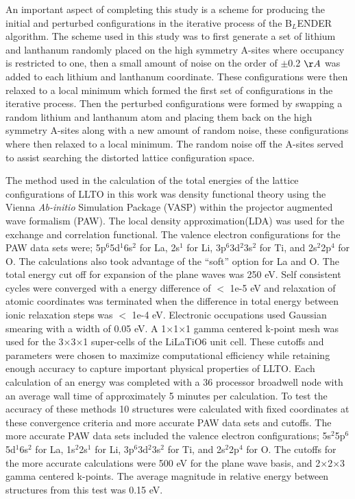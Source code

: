 \documentclass[aps,pre,reprint,superscriptaddress,showkeys]{revtex4-2}
\begin{document}
An important aspect of completing this study is a scheme for producing the initial and perturbed configurations in the iterative process of the B$_L$ENDER algorithm. The scheme used in this study was to first generate a set of lithium and lanthanum randomly placed on the high symmetry A-sites where occupancy is restricted to one, then a small amount of noise on the order of $\pm$0.2 $\AA$ was added to each lithium and lanthanum coordinate. These configurations were then relaxed to a local minimum which formed the first set of configurations in the iterative process.  Then the perturbed configurations  were formed by swapping a random lithium and lanthanum atom and placing them back on the high symmetry A-sites along with a new amount of random noise, these configurations where then relaxed to a local minimum. The random noise off the A-sites served to assist searching the distorted lattice configuration space. 

The method used in the calculation of the total energies of the lattice configurations of LLTO in this work was density functional theory using the Vienna \textit{Ab-initio} Simulation Package (VASP) \cite{Vasp1,Vasp2,Vasp3,Vasp4} within the projector augmented wave formalism (PAW)\cite{Blochl}. The local density approximation(LDA) was used for the exchange and correlation functional\cite{PBE}. The valence electron configurations for the PAW data sets were; 5p$^{6}$5d$^{1}$6s$^{2}$ for La, 2s$^{1}$ for Li, 3p$^{6}$3d$^{2}$3s$^{2}$ for Ti, and 2s$^{2}$2p$^{4}$ for O. The calculations also took advantage of the ``soft'' option for La and O.   The total energy cut off for expansion of the plane waves was 250 eV.  Self consistent cycles were converged with a energy difference of $<$ 1e-5 eV and relaxation  of atomic coordinates was terminated when the difference in total energy between ionic relaxation steps was $<$ 1e-4 eV. Electronic occupations used Gaussian smearing with a width of 0.05 eV.  A 1$\times$1$\times$1 gamma centered k-point mesh was used for the 3$\times$3$\times$1 super-cells of the LiLaTiO6 unit cell. These cutoffs and parameters were chosen to maximize computational efficiency while retaining enough accuracy to capture important physical properties of LLTO.  Each calculation of an energy was completed with a 36 processor broadwell node with an average wall time of approximately 5 minutes per calculation.  To test the accuracy of these methods 10 structures were calculated with fixed coordinates at these convergence criteria and more accurate PAW data sets and cutoffs. The more accurate PAW data sets included the valence electron configurations; 5s$^{2}$5p$^{6}$5d$^{1}$6s$^{2}$ for La, 1s$^2$2s$^{1}$ for Li, 3p$^{6}$3d$^{2}$3s$^{2}$ for Ti, and 2s$^{2}$2p$^{4}$ for O.  The cutoffs for the more accurate calculations were 500 eV for the plane wave basis, and 2$\times$2$\times$3 gamma centered k-points. The average magnitude  in relative energy between structures from this test was 0.15 eV. 
\end{document}
